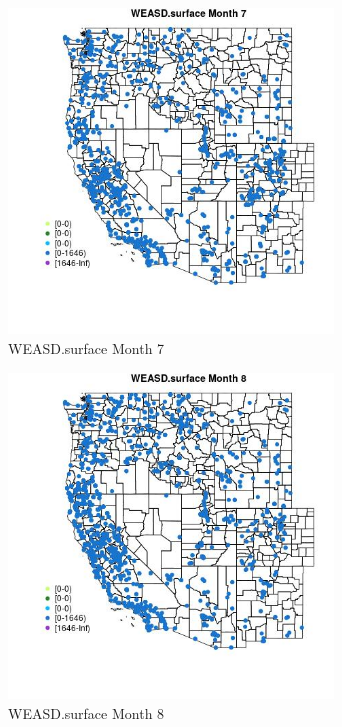 \begin{figure} 
\centering  
\includegraphics[width=0.77\textwidth]{Code_Outputs/Report_ML_input_PM25_Step4_part_f_de_duplicated_aveswNAs_MapObsMo7WEASDsurface.jpg} 
\caption{\label{fig:Report_ML_input_PM25_Step4_part_f_de_duplicated_aveswNAsMapObsMo7WEASDsurface}WEASD.surface Month 7} 
\end{figure} 
 

\begin{figure} 
\centering  
\includegraphics[width=0.77\textwidth]{Code_Outputs/Report_ML_input_PM25_Step4_part_f_de_duplicated_aveswNAs_MapObsMo8WEASDsurface.jpg} 
\caption{\label{fig:Report_ML_input_PM25_Step4_part_f_de_duplicated_aveswNAsMapObsMo8WEASDsurface}WEASD.surface Month 8} 
\end{figure} 
 

